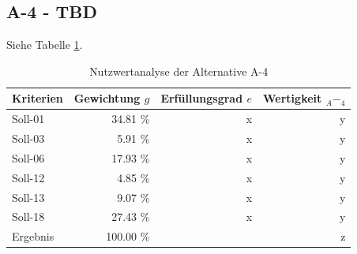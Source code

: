   \subsection{A-4 - TBD}
  
  Siehe Tabelle \ref{tab:nwaA4}.
  
  \begin{table}[ht]
    \sffamily 
    \begin{center}
      \begin{tabular}{l|rrr}
        \toprule
        Kriterien & Gewichtung \(g\) & Erfüllungsgrad \(e\) & Wertigkeit
        \(_A-_4\) \\
        \midrule
        Soll-01   & 34.81 \% & x & y \\
        Soll-03   &  5.91 \% & x & y \\
        Soll-06   & 17.93 \% & x & y \\
        Soll-12   &  4.85 \% & x & y \\
        Soll-13   &  9.07 \% & x & y \\
        Soll-18   & 27.43 \% & x & y \\
        \midrule
        \midrule
        Ergebnis  & 100.00 \% &   & z \\
        \bottomrule
      \end{tabular}
      \caption{Nutzwertanalyse der Alternative A-4}
      \label{tab:nwaA4}
    \end{center}
  \end{table}
